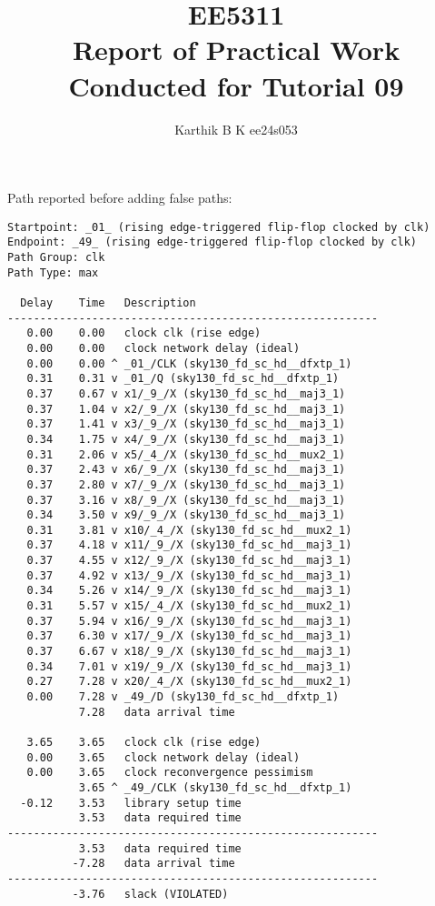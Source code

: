 \documentclass[12pt,a4paper]{article}
\begin{document}
\title{EE5311 \\ Report of Practical Work Conducted for Tutorial 09}
\author{Karthik B K ee24s053}
\maketitle

Path reported before adding false paths:

\begin{verbatim}
Startpoint: _01_ (rising edge-triggered flip-flop clocked by clk)
Endpoint: _49_ (rising edge-triggered flip-flop clocked by clk)
Path Group: clk
Path Type: max

  Delay    Time   Description
---------------------------------------------------------
   0.00    0.00   clock clk (rise edge)
   0.00    0.00   clock network delay (ideal)
   0.00    0.00 ^ _01_/CLK (sky130_fd_sc_hd__dfxtp_1)
   0.31    0.31 v _01_/Q (sky130_fd_sc_hd__dfxtp_1)
   0.37    0.67 v x1/_9_/X (sky130_fd_sc_hd__maj3_1)
   0.37    1.04 v x2/_9_/X (sky130_fd_sc_hd__maj3_1)
   0.37    1.41 v x3/_9_/X (sky130_fd_sc_hd__maj3_1)
   0.34    1.75 v x4/_9_/X (sky130_fd_sc_hd__maj3_1)
   0.31    2.06 v x5/_4_/X (sky130_fd_sc_hd__mux2_1)
   0.37    2.43 v x6/_9_/X (sky130_fd_sc_hd__maj3_1)
   0.37    2.80 v x7/_9_/X (sky130_fd_sc_hd__maj3_1)
   0.37    3.16 v x8/_9_/X (sky130_fd_sc_hd__maj3_1)
   0.34    3.50 v x9/_9_/X (sky130_fd_sc_hd__maj3_1)
   0.31    3.81 v x10/_4_/X (sky130_fd_sc_hd__mux2_1)
   0.37    4.18 v x11/_9_/X (sky130_fd_sc_hd__maj3_1)
   0.37    4.55 v x12/_9_/X (sky130_fd_sc_hd__maj3_1)
   0.37    4.92 v x13/_9_/X (sky130_fd_sc_hd__maj3_1)
   0.34    5.26 v x14/_9_/X (sky130_fd_sc_hd__maj3_1)
   0.31    5.57 v x15/_4_/X (sky130_fd_sc_hd__mux2_1)
   0.37    5.94 v x16/_9_/X (sky130_fd_sc_hd__maj3_1)
   0.37    6.30 v x17/_9_/X (sky130_fd_sc_hd__maj3_1)
   0.37    6.67 v x18/_9_/X (sky130_fd_sc_hd__maj3_1)
   0.34    7.01 v x19/_9_/X (sky130_fd_sc_hd__maj3_1)
   0.27    7.28 v x20/_4_/X (sky130_fd_sc_hd__mux2_1)
   0.00    7.28 v _49_/D (sky130_fd_sc_hd__dfxtp_1)
           7.28   data arrival time

   3.65    3.65   clock clk (rise edge)
   0.00    3.65   clock network delay (ideal)
   0.00    3.65   clock reconvergence pessimism
           3.65 ^ _49_/CLK (sky130_fd_sc_hd__dfxtp_1)
  -0.12    3.53   library setup time
           3.53   data required time
---------------------------------------------------------
           3.53   data required time
          -7.28   data arrival time
---------------------------------------------------------
          -3.76   slack (VIOLATED)
\end{verbatim}
\end{document}
